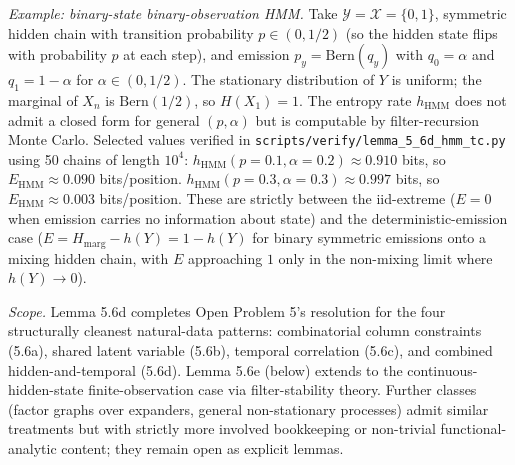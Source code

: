 \documentclass[
]{article}
\begin{document}
\emph{Example: binary-state binary-observation HMM.} Take
$\mathcal{Y} = \mathcal{X} = \{0, 1\}$, symmetric hidden chain
with transition probability $p \in (0, 1/2)$ (so the hidden state
flips with probability $p$ at each step), and emission $p_y =
\mathrm{Bern}(q_y)$ with $q_0 = \alpha$ and $q_1 = 1 - \alpha$
for $\alpha \in (0, 1/2)$. The stationary distribution of $Y$ is
uniform; the marginal of $X_n$ is $\mathrm{Bern}(1/2)$, so
$H(X_1) = 1$. The entropy rate $h_{\mathrm{HMM}}$ does not admit a
closed form for general $(p, \alpha)$ but is computable by
filter-recursion Monte Carlo. Selected values verified in
\texttt{scripts/verify/lemma\_5\_6d\_hmm\_tc.py} using 50 chains of
length $10^4$:
$h_{\mathrm{HMM}}(p = 0.1, \alpha = 0.2) \approx 0.910$ bits,
so $E_{\mathrm{HMM}} \approx 0.090$ bits/position.
$h_{\mathrm{HMM}}(p = 0.3, \alpha = 0.3) \approx 0.997$ bits,
so $E_{\mathrm{HMM}} \approx 0.003$ bits/position. These are
strictly between the iid-extreme ($E = 0$ when emission carries
no information about state) and the deterministic-emission case
($E = H_{\mathrm{marg}} - h(Y) = 1 - h(Y)$ for binary symmetric
emissions onto a mixing hidden chain, with $E$ approaching $1$
only in the non-mixing limit where $h(Y) \to 0$).

\emph{Scope.} Lemma 5.6d completes Open Problem 5's resolution for
the four structurally cleanest natural-data patterns:
combinatorial column constraints (5.6a), shared latent variable
(5.6b), temporal correlation (5.6c), and combined hidden-and-temporal
(5.6d). Lemma 5.6e (below) extends to the continuous-hidden-state
finite-observation case via filter-stability theory. Further classes
(factor graphs over expanders, general non-stationary processes)
admit similar treatments but with strictly more involved bookkeeping
or non-trivial functional-analytic content; they remain open as
explicit lemmas.
\end{document}
